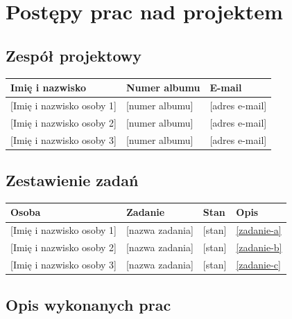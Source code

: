 \documentclass[11pt,a4paper,oneside]{article}
\newif\ifpodpowiedzi
\newcommand{\podpowiedz}[1]{\ifpodpowiedzi\par\begingroup\small\color{hintcolor}\textit{Wskazówka: #1}\par\endgroup\fi}
\newcommand{\pole}[1]{\textnormal{[#1]}}
\newcommand{\studentA}{\pole{Imię i nazwisko osoby 1}}
\newcommand{\studentB}{\pole{Imię i nazwisko osoby 2}}
\newcommand{\studentC}{\pole{Imię i nazwisko osoby 3}}
\newcommand{\albumA}{\pole{numer albumu}}
\newcommand{\albumB}{\pole{numer albumu}}
\newcommand{\albumC}{\pole{numer albumu}}
\begin{document}
\section{Postępy prac nad projektem}
\subsection{Zespół projektowy}
\podpowiedz{Podaj aktualne dane kontaktowe wszystkich członków zespołu. Imiona i nazwiska powinny być zgodne ze stroną tytułową. W przypadku zespołu dwuosobowego zatwierdzonego przez dyrekcję instytutu usuń dane trzeciej osoby ze strony tytułowej, obu tabel oraz odpowiedni blok opisu prac.}
\begin{tabularx}{\textwidth}{@{}Y p{0.22\textwidth} Y@{}}
\toprule
Imię i nazwisko & Numer albumu & E-mail\\
\midrule
\studentA & \albumA & \pole{adres e-mail}\\
\studentB & \albumB & \pole{adres e-mail}\\
\studentC & \albumC & \pole{adres e-mail}\\
\bottomrule
\end{tabularx}

\subsection{Zestawienie zadań}
\podpowiedz{Dla każdej osoby wymień zadania z danego okresu i ich stan: zakończone, w toku lub zablokowane. Przy pracy wspólnej wskaż konkretny wkład każdej osoby. Odwołania do opisów generuj poleceniem \texttt{\textbackslash ref}; nie wpisuj ręcznie numerów sekcji. Powielaj wiersze i opisy według potrzeb.}
\begin{tabularx}{\textwidth}{@{}p{} Y p{0.15\textwidth} p{0.12\textwidth}@{}}
\toprule
Osoba & Zadanie & Stan & Opis\\
\midrule
\studentA & \pole{nazwa zadania} & \pole{stan} & \ref{zadanie-a}\\
\studentB & \pole{nazwa zadania} & \pole{stan} & \ref{zadanie-b}\\
\studentC & \pole{nazwa zadania} & \pole{stan} & \ref{zadanie-c}\\
\bottomrule
\end{tabularx}

\newpage
\subsection{Opis wykonanych prac}
\podpowiedz{Dla każdego zadania podaj cel, wykonane czynności, konkretny rezultat i sposób jego sprawdzenia. Wskaż materiały potwierdzające prace, np. pliki, commity, zgłoszenia, zrzuty ekranu lub załączniki. Przy zadaniu w toku opisz, co już wykonano i co pozostało. Jeśli dana osoba nie wykonała prac w tym okresie, wskaż to wprost i wyjaśnij przyczynę.}
\end{document}
